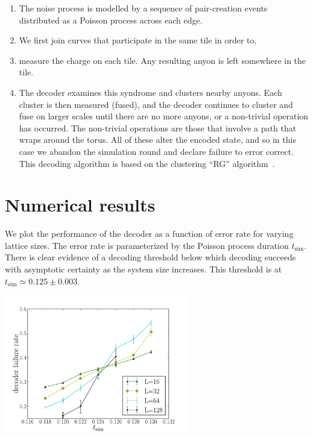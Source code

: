 \documentclass[a4paper,nofootinbib,superscriptaddress]{revtex4}
\begin{document}
		\begin{enumerate}
			\item The noise process is modelled by a sequence of pair-creation events distributed as a Poisson process across each edge.
			\item We first join curves that participate in the same tile in order to,
			\item measure the charge on each tile. Any resulting anyon is left somewhere in the tile.
			\item The decoder examines this syndrome and clusters nearby anyons. Each cluster is then measured (fused), and the decoder continues to cluster and fuse on larger scales until there are no more anyons, or a non-trivial operation has occurred. The non-trivial operations are those that involve a path that wraps around the torus. All of these alter the encoded state, and so in this case we abandon the simulation round and declare failure to error correct. This decoding algorithm is based on the clustering ``RG'' algorithm~\cite{Bravyi2011}.
		\end{enumerate}


\section{Numerical results}

	We plot the performance of the decoder as a function of error rate for varying lattice sizes. The error rate is parameterized by the Poisson process duration $t_{\mathrm{sim}}$. There is clear evidence of a decoding threshold below
which decoding succeeds with asymptotic certainty as the system size increases. This threshold is at $t_{\mathrm{sim}}\simeq 0.125 \pm 0.003.$

	\begin{center}\includegraphics[width=0.6\textwidth]{anyons-kyle.pdf}\end{center}
\end{document}
